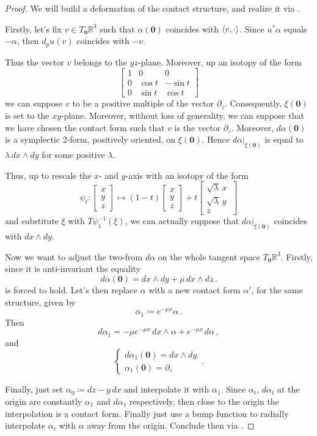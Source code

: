 \documentclass[10pt,a4paper]{amsart}
\DeclarePairedDelimiter{\ang}{\langle}{\rangle}
\newcommand{\R}{\mathbb{R}}
\newcommand{\zero}{\mathbf{0}}
\begin{document}
\begin{proof}
	We will build a deformation of the contact structure, and realize it via .
	
	Firstly, let's fix $v \in T_\zero\R^3$ such that $\alpha(\zero)$ coincides with $\ang{v,\cdot }$. Since $u^*\alpha$ equals $-\alpha$, then $d_pu(v)$ coincides with $-v$. 
	
	Thus the vector $v$ belongs to the $yz$-plane. Moreover, up an isotopy of the form
	\[
	\begin{bmatrix}
		1 & 0 & 0 \\
		0 & \cos t  & -\sin t\\
		0 & \sin t & \cos t
	\end{bmatrix}
	\]
	we can suppose $v$ to be a positive multiple of the vector $\partial_z$. Consequently, $\xi(\zero)$ is set to the $xy$-plane. Moreover, without loss of generality, we can suppose that we have chosen the contact form such that $v$ is the vector $\partial_z$. Moreover, $d\alpha(\zero)$ is a symplectic 2-form, positively oriented, on $\xi(\zero)$. Hence $d\alpha|_{\xi(\zero)}$ is equal to $\lambda\,dx \wedge dy$ for some positive $\lambda$.
	
	Thus, up to rescale the $x$- and $y$-axis with an isotopy of the form
	\[
	\psi_t \colon
	\begin{bmatrix}
		x \\
		y \\
		z
	\end{bmatrix}
	\mapsto (1-t)
	\begin{bmatrix}
		x\\[0.5ex]
		y\\[0.5ex]
		z
	\end{bmatrix}
	+ t
	\begin{bmatrix}
		\sqrt{\lambda}\,x\  \\[0.5ex]
		\sqrt{\lambda}\,y \\[0.5ex]
		z
	\end{bmatrix} 
	\]
	and substitute $\xi$ with $T\psi_1^{-1}(\xi)$, we can actually suppose that $d\alpha|_{\xi(\zero)}$ coincides with $dx \wedge dy$.
	
	Now we want to adjust the two-from $d\alpha$ on the whole tangent space $T_\zero\R^3$. Firstly, since it is anti-invariant the equality
	\[
	d\alpha(\zero) = dx\wedge dy + \mu\, dx \wedge dz\,.
	\]
	is forced to hold. Let's then replace $\alpha$ with a new contact form $\alpha'$, for the same structure, given by
	\[
	\alpha_1 \coloneqq e^{-\mu x}\alpha\,.
	\]
	Then 
	\[
	d\alpha_1 = -\mu e^{-\mu x}\,dx \wedge \alpha + e^{-\mu x}\,d\alpha\,,
	\]
	and
	\[
	\begin{cases}
		d\alpha_1(\zero) = dx \wedge dy\\
		\alpha_1(\zero) = \partial_z
	\end{cases}\,.
	\]
	
	
	Finally, just set $\alpha_0 \coloneqq dz - y\,dx$ and interpolate it with $\alpha_1$. Since $\alpha_t$, $d\alpha_t$ at the origin are constantly $\alpha_1$ and $d\alpha_1$ respectively, then close to the origin the interpolation is a contact form. Finally just use a bump function to radially interpolate $\alpha_t$ with $\alpha$ away from the origin. Conclude then via .
\end{proof}
\end{document}
